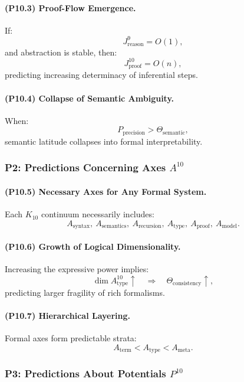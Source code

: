 \paragraph{(P10.3) Proof-Flow Emergence.}
If:
\[
J_{\mathrm{reason}}^{9} = O(1),
\]
and abstraction is stable, then:
\[
J_{\mathrm{proof}}^{10} = O(n),
\]
predicting increasing determinacy of inferential steps.

\paragraph{(P10.4) Collapse of Semantic Ambiguity.}
When:
\[
P_{\mathrm{precision}} > \Theta_{\mathrm{semantic}},
\]
semantic latitude collapses into formal interpretability.

\subsubsection{P2: Predictions Concerning Axes $A^{10}$}

\paragraph{(P10.5) Necessary Axes for Any Formal System.}
Each $K_{10}$ continuum necessarily includes:
\[
A_{\mathrm{syntax}},\
A_{\mathrm{semantics}},\
A_{\mathrm{recursion}},\
A_{\mathrm{type}},\
A_{\mathrm{proof}},\
A_{\mathrm{model}}.
\]

\paragraph{(P10.6) Growth of Logical Dimensionality.}
Increasing the expressive power implies:
\[
\dim A_{\mathrm{type}}^{10} \uparrow \quad
\Rightarrow \quad
\Theta_{\mathrm{consistency}} \uparrow,
\]
predicting larger fragility of rich formalisms.

\paragraph{(P10.7) Hierarchical Layering.}
Formal axes form predictable strata:
\[
A_{\mathrm{term}} < A_{\mathrm{type}} < A_{\mathrm{meta}}.
\]

\subsubsection{P3: Predictions About Potentials $P^{10}$}

